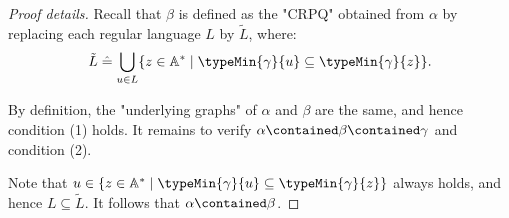 \begin{proof}[Proof details]
	Recall that $\beta$ is defined as the "CRPQ" obtained from $\alpha$ by replacing each regular language $L$ by $\tilde{L}$, where:
	\[
		\tilde{L} \defeq \bigcup_{u\in L}
			\{z\in \A^*\mid \typeMin{\gamma}{u}\subseteq \typeMin{\gamma}{z}\}.
	\]

	
	 By definition, the "underlying graphs" of $\alpha$ and $\beta$ are the same, and hence condition (1) holds. It remains to verify  $\alpha \contained \beta\contained \gamma$  and condition (2).

	Note that $u\in \{z\in \A^*\mid \typeMin{\gamma}{u}\subseteq \typeMin{\gamma}{z}\}$ always holds, and hence $L\subseteq \tilde{L}$. It follows that $\alpha \contained \beta$. 


\end{proof}
